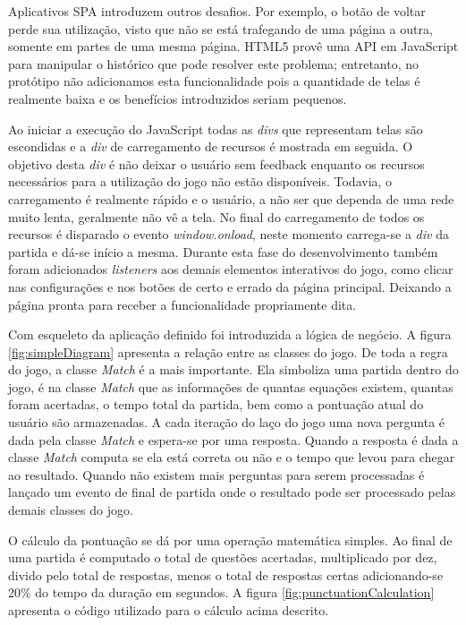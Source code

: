 Aplicativos SPA introduzem outros desafios. Por exemplo, o botão
de voltar perde sua utilização, visto que não se está trafegando
de uma página a outra, somente em partes de uma mesma página. HTML5
provê uma API em JavaScript para manipular o histórico que pode
resolver este problema; entretanto, no protótipo não adicionamos
esta funcionalidade pois a quantidade de telas é realmente baixa e os
benefícios introduzidos seriam pequenos.

Ao iniciar a execução do JavaScript todas as \textit{divs} que
representam telas são escondidas e a \textit{div} de carregamento de
recursos é mostrada em seguida. O objetivo desta \textit{div} é não deixar
o usuário sem feedback enquanto os recursos necessários para a
utilização do jogo não estão disponíveis. Todavia, o carregamento
é realmente rápido e o usuário, a não ser que dependa de uma rede
muito lenta, geralmente não vê a tela. No final do carregamento
de todos os recursos é disparado o evento \textit{window.onload},
neste momento carrega-se a \textit{div} da partida e dá-se início a mesma.
Durante esta fase do desenvolvimento também foram adicionados
\textit{listeners} aos demais elementos interativos do jogo, como
clicar nas configurações e nos botões de certo e errado da página
principal. Deixando a página pronta para receber a funcionalidade
propriamente dita.

Com esqueleto da aplicação definido foi introduzida a lógica
de negócio. A figura \ref{fig:simpleDiagram} apresenta a
relação entre as classes do jogo. De toda a regra do jogo, a classe
\textit{Match} é a mais importante. Ela simboliza uma partida dentro
do jogo, é na classe \textit{Match} que as informações de quantas
equações existem, quantas foram acertadas, o tempo total da partida,
bem como a pontuação atual do usuário são armazenadas. A cada
iteração do laço do jogo uma nova pergunta é dada pela classe
\textit{Match} e espera-se por uma resposta. Quando a resposta é dada
a classe \textit{Match} computa se ela está correta ou não e
o tempo que levou para chegar ao resultado. Quando não existem mais
perguntas para serem processadas é lançado um evento de final de
partida onde o resultado pode ser processado pelas demais classes do
jogo.

O cálculo da pontuação se dá por uma operação matemática simples.
Ao final de uma partida é computado o total de questões acertadas,
multiplicado por dez, divido pelo total de respostas, menos o total de
respostas certas adicionando-se 20\% do tempo da duração em segundos.
A figura \ref{fig:punctuationCalculation} apresenta o código utilizado
para o cálculo acima descrito.

